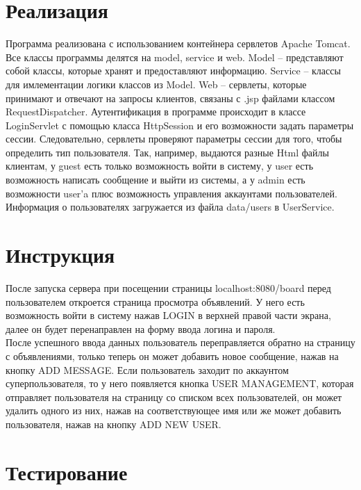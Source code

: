 \documentclass{article}
\begin{document}
    \section{Реализация}
    Программа реализована с использованием контейнера сервлетов Apache Tomcat.
    Все классы программы делятся на model, service и web. Model -- представляют собой классы, которые хранят и предоставляют информацию. Service -- классы для имлементации логики классов из Model. Web -- сервлеты, которые принимают и отвечают на запросы клиентов, связаны с .jsp файлами классом RequestDispatcher. 
    Аутентификация в программе происходит в классе LoginServlet с помощью класса HttpSession и его возможности задать параметры сессии. 
Следовательно, сервлеты проверяют параметры сессии для того, чтобы определить тип пользователя.  
	Так, например, выдаются разные Html файлы клиентам, у guest есть только возможность войти в систему, у user есть возможность написать сообщение и выйти из системы, а у admin есть возможности user'a плюс возможность управления аккаунтами пользователей.
	Информация о пользователях загружается из файла data/users в UserService. 
    \section{Инструкция}
    После запуска сервера при посещении страницы localhost:8080/board перед пользователем откроется страница просмотра объявлений. У него есть возможность войти в систему нажав LOGIN в верхней правой части экрана, далее он будет перенаправлен на форму ввода логина и пароля.\\ 	 После успешного ввода данных пользователь переправляется обратно на страницу с объявлениями, только теперь он может добавить новое сообщение, нажав на кнопку ADD MESSAGE. Если пользователь заходит по аккаунтом суперпользователя, то у него появляется кнопка USER MANAGEMENT, которая отправляет пользователя на страницу со списком всех пользователей, он может удалить одного из них, нажав на соответствующее имя или же может добавить пользователя, нажав на кнопку ADD NEW USER.
    \section{Тестирование}
\end{document}
